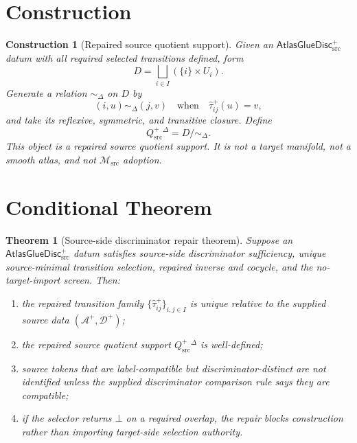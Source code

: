 \documentclass[11pt]{article}
\newcommand{\Msrc}{\mathcal{M}_{\mathrm{src}}}
\newcommand{\AtlasGlueDisc}{\mathsf{AtlasGlueDisc}_{\mathrm{src}}^{+}}
\newcommand{\Qsrc}{Q_{\mathrm{src}}^{+}}
\newcommand{\Disj}{\bigsqcup}
\newtheorem{construction}{Construction}
\newtheorem{theorem}{Theorem}
\begin{document}
\section{Construction}

\begin{construction}[Repaired source quotient support]
Given an \(\AtlasGlueDisc\) datum with all required selected transitions
defined, form
\[
  D=\Disj_{i\in I}(\{i\}\times U_i).
\]
Generate a relation \(\sim_{\Delta}\) on \(D\) by
\[
  (i,u)\sim_{\Delta}(j,v)
  \quad\text{when}\quad
  \widehat{\tau}_{ij}^+(u)=v,
\]
and take its reflexive, symmetric, and transitive closure. Define
\[
  \Qsrc^{\Delta}=D/{\sim_{\Delta}}.
\]
This object is a repaired source quotient support. It is not a target
manifold, not a smooth atlas, and not \(\Msrc\) adoption.
\end{construction}

\section{Conditional Theorem}

\begin{theorem}[Source-side discriminator repair theorem]
Suppose an \(\AtlasGlueDisc\) datum satisfies source-side discriminator
sufficiency, unique source-minimal transition selection, repaired inverse and
cocycle, and the no-target-import screen. Then:
\begin{enumerate}
  \item the repaired transition family
  \(\{\widehat{\tau}_{ij}^+\}_{i,j\in I}\) is unique relative to the supplied
  source data \((\mathcal A^+,\mathcal D^+)\);
  \item the repaired source quotient support \(\Qsrc^{\Delta}\) is
  well-defined;
  \item source tokens that are label-compatible but discriminator-distinct are
  not identified unless the supplied discriminator comparison rule says they
  are compatible;
  \item if the selector returns \(\bot\) on a required overlap, the repair
  blocks construction rather than importing target-side selection authority.
\end{enumerate}
\end{theorem}
\end{document}
